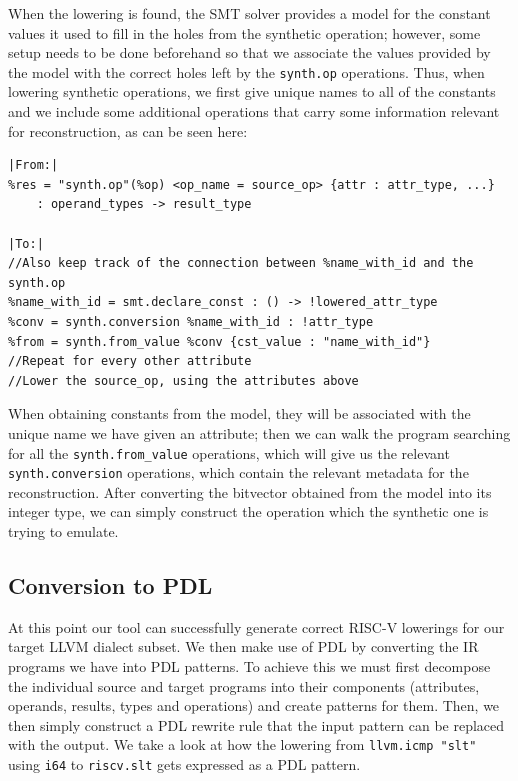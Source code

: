 When the lowering is found, the SMT solver provides a model for the constant values it used to fill in the holes 
from the synthetic operation; however, some setup needs to be done beforehand so that we associate 
the values provided by the model with the correct holes left by the \texttt{synth.op} operations. Thus, 
when lowering synthetic operations, we first give unique names to all of the constants and we 
include some additional operations that carry some information relevant for 
reconstruction, as can be seen here:

\begin{verbatim}
|From:|
%res = "synth.op"(%op) <op_name = source_op> {attr : attr_type, ...} 
    : operand_types -> result_type

|To:| 
//Also keep track of the connection between %name_with_id and the synth.op
%name_with_id = smt.declare_const : () -> !lowered_attr_type
%conv = synth.conversion %name_with_id : !attr_type
%from = synth.from_value %conv {cst_value : "name_with_id"}
//Repeat for every other attribute
//Lower the source_op, using the attributes above
\end{verbatim}

When obtaining constants from the model, they will be associated with the unique name we have given an attribute;
then we can walk the program searching for all the \texttt{synth.from\_value} operations, which will give
us the relevant \texttt{synth.conversion} operations, which contain the relevant metadata for the reconstruction. 
After converting the bitvector obtained from the model into its integer type, we can simply construct the 
operation which the synthetic one is trying to emulate. \\



\subsection{Conversion to PDL}

At this point our tool can successfully generate correct RISC-V lowerings for our target LLVM dialect
subset. We then make use of PDL by converting the IR programs we have into PDL patterns. To achieve 
this we must first decompose the individual source and target programs into their components (attributes, 
operands, results, types and operations) and create patterns for them. Then, we then simply construct
a PDL rewrite rule that the input pattern can be replaced with the output. We take a look at how
the lowering from \texttt{llvm.icmp "slt"} using \texttt{i64} to \texttt{riscv.slt} gets expressed
as a PDL pattern.

